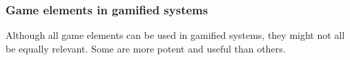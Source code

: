 \subsubsection{Game elements in gamified systems}
Although all game elements can be used in gamified systems, they might not all be equally relevant. Some are more potent and useful than others.%


